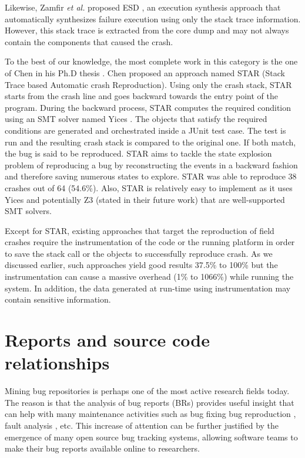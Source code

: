 Likewise, Zamfir {\it et al.} proposed ESD \cite{Zamfir2010}, an execution synthesis approach that automatically synthesizes failure execution using only the stack trace information. However, this stack trace is extracted from the core dump and may not always contain the components that caused the crash.

To the best of our knowledge, the most complete work in this category is the one of Chen in his Ph.D thesis \cite{Chen2013a}.
Chen proposed an approach named STAR (Stack Trace based Automatic crash Reproduction).
Using only the crash stack, STAR starts from the crash line and goes backward towards the entry point of the program. During the backward process, STAR computes the required condition using an SMT solver named Yices \cite{Dutertre2006}.
The objects that satisfy the required conditions are generated and orchestrated inside a JUnit test case. The test is run and the resulting crash stack is compared to the original one.
If both match, the bug is said to be reproduced.
STAR aims to tackle the state explosion problem of reproducing a bug by reconstructing the events in a backward fashion and therefore saving numerous states to explore. STAR was able to reproduce 38 crashes out of 64 (54.6\%).
Also, STAR is relatively easy to implement as it uses Yices \cite{Dutertre2006} and potentially Z3 \cite{de2008z3} (stated in their future work) that are well-supported SMT solvers.

Except for STAR, existing approaches that target the reproduction of field crashes require the instrumentation of the code or the running platform in order to save the stack call or the objects to successfully reproduce crash.
As we discussed earlier, such approaches yield good results 37.5\% to 100\% but the instrumentation can cause a massive overhead (1\% to 1066\%) while running the system.
In addition, the data generated at run-time using instrumentation may contain sensitive information.

\section{Reports and source code relationships\label{rel:issue-rela}}

Mining bug repositories is perhaps one of the most active research fields today. The reason is that the analysis of bug reports (BRs) provides useful insight that can help with many maintenance activities such as bug fixing \cite{Weiß2007,Saha2014} bug reproduction \cite{Chen2013,Artzi2008,Jin2012}, fault analysis \cite{Nessa2008}, etc.
This increase of attention can be further justified by the emergence of many open source bug tracking systems, allowing software teams to make their bug reports available online to researchers.

